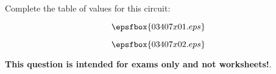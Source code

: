 

Complete the table of values for this circuit:

$$\epsfbox{03407x01.eps}$$







$$\epsfbox{03407x02.eps}$$







{\bf This question is intended for exams only and not worksheets!}.



